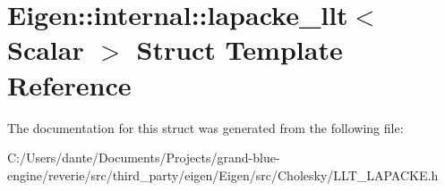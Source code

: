 \hypertarget{struct_eigen_1_1internal_1_1lapacke__llt}{}\section{Eigen\+::internal\+::lapacke\+\_\+llt$<$ Scalar $>$ Struct Template Reference}
\label{struct_eigen_1_1internal_1_1lapacke__llt}


The documentation for this struct was generated from the following file\+:\begin{DoxyCompactItemize}
\item 
C\+:/\+Users/dante/\+Documents/\+Projects/grand-\/blue-\/engine/reverie/src/third\+\_\+party/eigen/\+Eigen/src/\+Cholesky/L\+L\+T\+\_\+\+L\+A\+P\+A\+C\+K\+E.\+h\end{DoxyCompactItemize}
